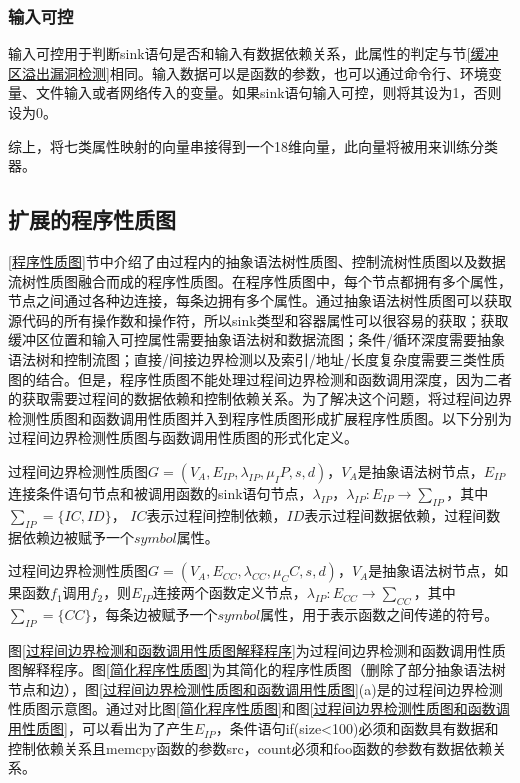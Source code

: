 {\subsubsection{输入可控}

输入可控用于判断sink语句是否和输入有数据依赖关系，此属性的判定与节\ref{缓冲区溢出漏洞检测}相同。输入数据可以是函数的参数，也可以通过命令行、环境变量、文件输入或者网络传入的变量。如果sink语句输入可控，则将其设为1，否则设为0。

综上，将七类属性映射的向量串接得到一个18维向量，此向量将被用来训练分类器。

\subsection{扩展的程序性质图}
\label{扩展的程序性质图}

\ref{程序性质图}节中介绍了由过程内的抽象语法树性质图、控制流树性质图以及数据流树性质图融合而成的程序性质图。在程序性质图中，每个节点都拥有多个属性，节点之间通过各种边连接，每条边拥有多个属性。通过抽象语法树性质图可以获取源代码的所有操作数和操作符，所以sink类型和容器属性可以很容易的获取；获取缓冲区位置和输入可控属性需要抽象语法树和数据流图；条件/循环深度需要抽象语法树和控制流图；直接/间接边界检测以及索引/地址/长度复杂度需要三类性质图的结合。但是，程序性质图不能处理过程间边界检测和函数调用深度，因为二者的获取需要过程间的数据依赖和控制依赖关系。为了解决这个问题，将过程间边界检测性质图和函数调用性质图并入到程序性质图形成扩展程序性质图。以下分别为过程间边界检测性质图与函数调用性质图的形式化定义。

\begin{definition}
 \label{过程间边界检测程序性质图}
 过程间边界检测性质图$G=(V_A,E_{IP},\lambda_{IP} ,\mu_IP, s, d)$，$V_{A}$是抽象语法树节点，$E_{IP}$连接条件语句节点和被调用函数的sink语句节点，$\lambda_{IP}$，$\lambda_{IP}:E_{IP} \rightarrow \sum_{IP}$，其中$\sum_{IP}=\{IC, ID\}$， $IC$表示过程间控制依赖，$ID$表示过程间数据依赖，过程间数据依赖边被赋予一个$symbol$属性。
\end{definition}

\begin{definition}
 \label{函数调用性质图}
 过程间边界检测性质图$G=(V_{A},E_{CC},\lambda_{CC} ,\mu_CC, s, d)$，$V_{A}$是抽象语法树节点，如果函数$f_1$调用$f_2$，则$E_{IP}$连接两个函数定义节点，$\lambda_{IP}:E_{CC} \rightarrow \sum_{CC}$，其中$\sum_{IP}=\{CC\}$，每条边被赋予一个$symbol$属性，用于表示函数之间传递的符号。
\end{definition}

图\ref{过程间边界检测和函数调用性质图解释程序}为过程间边界检测和函数调用性质图解释程序。图\ref{简化程序性质图}为其简化的程序性质图（删除了部分抽象语法树节点和边），图\ref{过程间边界检测性质图和函数调用性质图}(a)是的过程间边界检测性质图示意图。通过对比图\ref{简化程序性质图}和图\ref{过程间边界检测性质图和函数调用性质图}，可以看出为了产生$E_{IP}$，条件语句if(size<100)必须和函数具有数据和控制依赖关系且memcpy函数的参数src，count必须和foo函数的参数有数据依赖关系。

}
